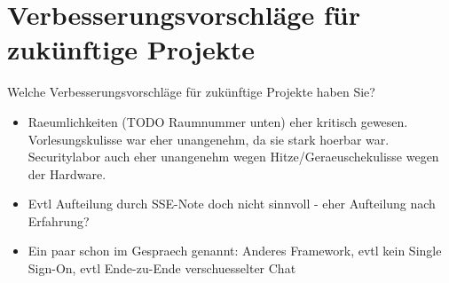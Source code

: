 \documentclass[12pt,DIV14,BCOR10mm,a4paper,parskip=half-,headsepline,headinclude,english,ngerman,bibliography=totocnumbered]{scrreprt}
\begin{document}
\chapter{Verbesserungsvorschläge für zukünftige Projekte}

Welche Verbesserungsvorschläge für zukünftige Projekte haben Sie?

\begin{itemize}
  \item Raeumlichkeiten (TODO Raumnummer unten) eher kritisch gewesen. Vorlesungskulisse war eher unangenehm, da sie stark hoerbar war. Securitylabor auch eher unangenehm wegen Hitze/Geraeuschekulisse wegen der Hardware.
  \item Evtl Aufteilung durch SSE-Note doch nicht sinnvoll - eher Aufteilung nach Erfahrung?
  \item Ein paar schon im Gespraech genannt: Anderes Framework, evtl kein Single Sign-On, evtl Ende-zu-Ende verschuesselter Chat
\end{itemize}

\printbibliography

\printacronyms[title=Abkürzungsverzeichnis,toctitle=Abkürzungsverzeichnis]
\printglossary[title=Glossar,toctitle=Glossar,type=main]

\iftotalfigures
  \listoffigures
\fi


\begin{appendices}

\end{appendices}
\end{document}
